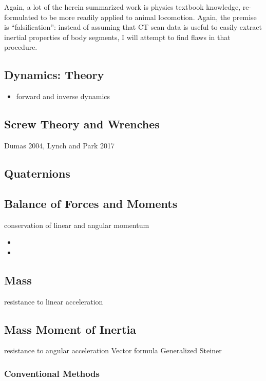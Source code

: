 Again, a lot of the herein summarized work is physics textbook knowledge, re-formulated to be more readily applied to animal locomotion.
Again, the premise is ``falsification'': instead of assuming that CT scan data is useful to easily extract inertial properties of body segments, I will attempt to find flaws in that procedure.


\subsection{Dynamics: Theory}
\label{sec:org8f46eaf}
\begin{itemize}
\item forward and inverse dynamics
\end{itemize}

\subsection{Screw Theory and Wrenches}
\label{sec:orgef60c30}
Dumas 2004, Lynch and Park 2017

\subsection{Quaternions}
\label{sec:org25237d9}

\subsection{Balance of Forces and Moments}
\label{sec:org64c0782}
conservation of linear and angular momentum
\begin{itemize}
\item %
\item %
\end{itemize}

\subsection{Mass}
\label{sec:org6e3fd14}
resistance to linear acceleration

\subsection{Mass Moment of Inertia}
\label{sec:org01ed44a}
resistance to angular acceleration
Vector formula
Generalized Steiner
\subsubsection{Conventional Methods}
\label{sec:org5cf946a}
